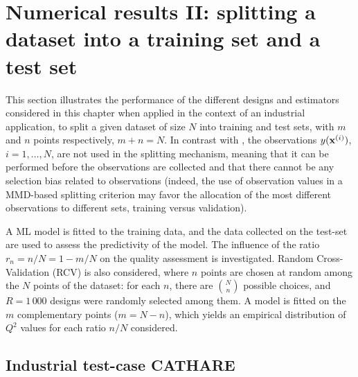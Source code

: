 \section{Numerical results II: splitting a dataset into a training set and a test set}\label{sec:val_res2}
This section illustrates the performance of the different designs and estimators considered in this chapter when applied in the context of an industrial application, to split a given dataset of size $N$ into training and test sets, with $m$ and $n$ points respectively, $m+n=N$. 
In contrast with \cite{josvak21}, the observations $y({\bf x}^{(i)})$, $i=1,\ldots,N$, are not used in the splitting mechanism, meaning that it can be performed before the observations are collected and that there cannot be any selection bias related to observations 
(indeed, the use of observation values in a MMD-based splitting criterion may favor the allocation of the most different observations to different sets, training versus validation).

A ML model is fitted to the training data, and the data collected on the test-set are used to assess the predictivity of the model. 
The influence of the ratio $r_n=n/N=1-m/N$ on the quality assessment is investigated. 
Random Cross-Validation (RCV) is also considered, where $n$ points are chosen at random among the $N$ points of the dataset: for each $n$, there are $N \choose n$ possible choices, and $R=1\,000$ designs were randomly selected among them. 
A model is fitted on the $m$ complementary points ($m=N-n$), which yields an empirical distribution of $Q^2$ values for each ratio $n/N$ considered. 

\subsection{Industrial test-case CATHARE}

